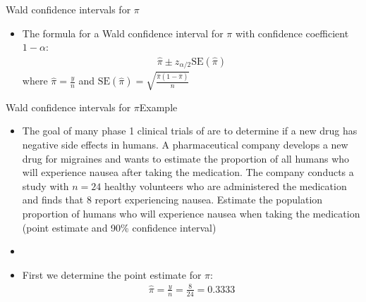 \documentclass[xcolor=dvipsnames]{beamer}
\begin{document}
\begin{frame}{Wald confidence intervals for $\pi$}
	\begin{itemize}
		\item The formula for a Wald confidence interval for $\pi$ with confidence coefficient $1-\alpha$: \pause
		\begin{gather*}
		\hat{\pi} \pm z_{\alpha/2} \text{SE}(\hat{\pi})
		\end{gather*} \pause
		where $\hat{\pi} = \frac{y}{n}$ and $\text{SE}(\hat{\pi}) = \sqrt{\frac{\hat{\pi}(1-\hat{\pi})}{n}}$
	\end{itemize}
\end{frame}

\begin{frame}{Wald confidence intervals for $\pi$}{Example}
	\begin{itemize}
		\item The goal of many phase 1 clinical trials of are to determine if a new drug has negative side effects in humans. A pharmaceutical company develops a new drug for migraines and wants to estimate the proportion of all humans who will experience nausea after taking the medication. The company conducts a study with $n = 24$ healthy volunteers who are administered the medication and finds that 8 report experiencing nausea. Estimate the population proportion of humans who will experience nausea when taking the medication (point estimate and 90\% confidence interval)  \pause
		\item[]
		\item First we determine the point estimate for $\pi$:  \pause
		\begin{gather*}
			\hat{\pi} = \frac{y}{n} = \frac{8}{24} = 0.3333
		\end{gather*}
	\end{itemize}
\end{frame}
\end{document}
